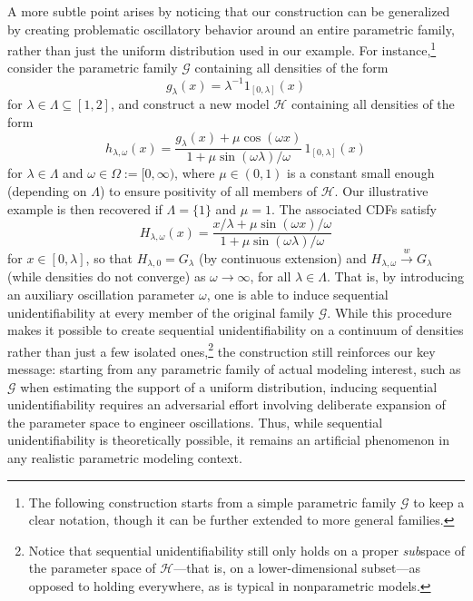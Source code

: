 \documentclass[11pt,twoside]{article}
\newcommand{\wc}{\overset{w}{\longrightarrow}}
\begin{document}
A more subtle point arises by noticing that our construction can be generalized by creating problematic oscillatory behavior around an entire parametric family, rather than just the uniform distribution used in our example. For instance,\footnote{The following construction starts from a simple parametric family $\mathcal G$ to keep a clear notation, though it can be further extended to more general families.} consider the parametric family $\mathcal{G}$ containing all densities of the form
%
\begin{equation*}
    g_\lambda(x) = \lambda^{-1} 1_{[0, \lambda]}(x)
\end{equation*}
%
for $\lambda \in \Lambda \subseteq [1, 2]$, and construct a new model $\mathcal{H}$ containing all densities of the form
%
\begin{equation*}
    h_{\lambda, \omega}(x) = \frac{g_\lambda(x) + \mu \cos(\omega x)}{1 + \mu \sin(\omega \lambda)/\omega} \, 1_{[0, \lambda]}(x)
\end{equation*}
%
for $\lambda \in \Lambda$ and $\omega \in \Omega := [0, \infty)$, where $\mu \in (0,1)$ is a constant small enough (depending on $\Lambda$) to ensure positivity of all members of $\mathcal{H}$. Our illustrative example is then recovered if $\Lambda = \{1\}$ and $\mu=1$. The associated CDFs satisfy
%
\begin{equation*}
    H_{\lambda, \omega}(x) = \frac{x/\lambda + \mu \sin(\omega x)/\omega}{1 + \mu \sin(\omega \lambda)/\omega}
\end{equation*}
%
for $x \in [0, \lambda]$, so that $H_{\lambda, 0} = G_\lambda$ (by continuous extension) and $H_{\lambda, \omega} \wc G_\lambda$ (while densities do not converge) as $\omega \to \infty$, for all $\lambda \in \Lambda$. That is, by introducing an auxiliary oscillation parameter $\omega$, one is able to induce sequential unidentifiability at every member of the original family $\mathcal{G}$. While this procedure makes it possible to create sequential unidentifiability on a continuum of densities rather than just a few isolated ones,\footnote{Notice that sequential unidentifiability still only holds on a proper \emph{sub}space of the parameter space of $\mathcal{H}$---that is, on a lower-dimensional subset---as opposed to holding everywhere, as is typical in nonparametric models.} the construction still reinforces our key message: starting from any parametric family of actual modeling interest, such as $\mathcal{G}$ when estimating the support of a uniform distribution, inducing sequential unidentifiability requires an adversarial effort involving deliberate expansion of the parameter space to engineer oscillations. Thus, while sequential unidentifiability is theoretically possible, it remains an artificial phenomenon in any realistic parametric modeling context.
\end{document}
